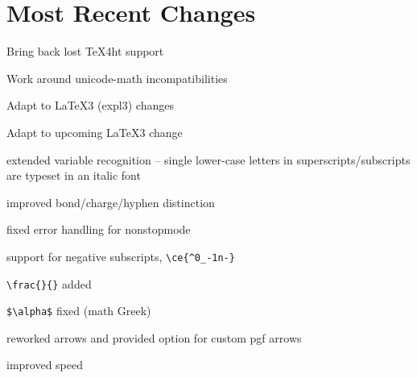 \documentclass[a4paper,notitlepage,parskip=half]{scrreprt}
\begin{document}
\section{Most Recent Changes}%

\begin{compactitem}
\item Bring back lost TeX4ht support
\end{compactitem}

\begin{compactitem}
\item Work around unicode-math incompatibilities
\end{compactitem}

\begin{compactitem}
\item Adapt to \LaTeX3 (expl3) changes
\end{compactitem}

\begin{compactitem}
\item Adapt to upcoming \LaTeX3 change
\end{compactitem}

\begin{compactitem}
\item extended variable recognition -- single lower-case letters in superscripts/subscripts are typeset in an italic font
\item improved bond/charge/hyphen distinction 
\item fixed error handling for nonstopmode
\end{compactitem}

\begin{compactitem}
\item support for negative subscripts, \verb|\ce{^0_-1n-}|
\item \verb|\frac{}{}| added
\item \verb|$\alpha$| fixed (math Greek)
\end{compactitem}

\begin{compactitem}
\item reworked arrows and provided option for custom pgf arrows
\item improved speed
\end{compactitem}
\end{document}
